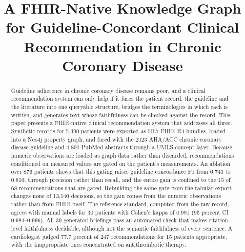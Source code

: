 \documentclass[conference]{IEEEtran}
\begin{document}
\title{A FHIR-Native Knowledge Graph for Guideline-Concordant Clinical
Recommendation in Chronic Coronary Disease}

\author{
\and
{}
}

\maketitle

\begin{abstract}
Guideline adherence in chronic coronary disease remains poor, and a clinical
recommendation system can only help if it fuses the patient record, the guideline and
the literature into one queryable structure, bridges the terminologies in which each is written, and generates
text whose faithfulness can be checked against the record. This paper presents a
FHIR-native clinical recommendation system that addresses all three. Synthetic records
for 5,490 patients were exported as HL7 FHIR R4 bundles, loaded into a Neo4j property graph, and
fused with the 2023 AHA/ACC chronic coronary disease guideline and 4,801 PubMed abstracts
through a UMLS concept layer. Because numeric observations are loaded as graph data rather
than discarded, recommendations conditioned on measured values are gated on the patient's
measurements. An ablation over 876 patients shows that this gating raises guideline
concordance F1 from 0.743 to 0.810, through precision rather than recall, and the entire
gain is confined to the 15 of 68 recommendations that are gated. Rebuilding the same
gate from the tabular export changes none of 13,140 decisions, so the gain comes from the
numeric observations rather than from FHIR itself. The reference standard, computed from the
raw record, agrees with manual labels for 30 patients with Cohen's kappa of 0.991 (95 percent
CI 0.984--0.996). All 30 generated briefings pass an automated check that makes
citation-level faithfulness decidable, although not the semantic faithfulness of every
sentence. A cardiologist judged 77.7 percent of 247 recommendations for 15 patients
appropriate, with the inappropriate ones concentrated on antithrombotic therapy.
\end{abstract}
\end{document}
